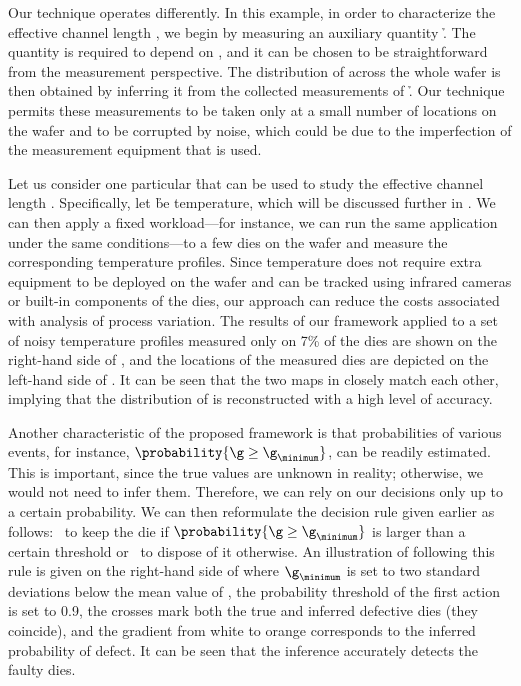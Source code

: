 Our technique operates differently. In this example, in order to characterize
the effective channel length \g, we begin by measuring an auxiliary quantity \h.
The quantity is required to depend on \g, and it can be chosen to be
straightforward from the measurement perspective. The distribution of \g across
the whole wafer is then obtained by inferring it from the collected measurements
of \h. Our technique permits these measurements to be taken only at a small
number of locations on the wafer and to be corrupted by noise, which could be
due to the imperfection of the measurement equipment that is used.

Let us consider one particular \h that can be used to study the effective
channel length \g. Specifically, let \h be temperature, which will be discussed
further in . We can then apply a fixed workload---for
instance, we can run the same application under the same conditions---to a few
dies on the wafer and measure the corresponding temperature profiles. Since
temperature does not require extra equipment to be deployed on the wafer and can
be tracked using infrared cameras \cite{mesa-martinez2007} or built-in
components of the dies, our approach can reduce the costs associated with
analysis of process variation. The results of our framework applied to a set of
noisy temperature profiles measured only on 7\% of the dies are shown on the
right-hand side of , and the locations of
the measured dies are depicted on the left-hand side of
. It can be seen that the two maps in
 closely match each other, implying that the
distribution of \g is reconstructed with a high level of accuracy.

Another characteristic of the proposed framework is that probabilities of
various events, for instance, $\probability{\g \geq \g_\minimum}$, can be
readily estimated. This is important, since the true values are unknown in
reality; otherwise, we would not need to infer them. Therefore, we can rely on
our decisions only up to a certain probability. We can then reformulate the
decision rule given earlier as follows: \one~to keep the die if $\probability{\g
\geq \g_\minimum}$ is larger than a certain threshold or \two~to dispose of it
otherwise. An illustration of following this rule is given on the right-hand
side of  where $\g_\minimum$ is set to two
standard deviations below the mean value of \g, the probability threshold of the
first action is set to 0.9, the crosses mark both the true and inferred
defective dies (they coincide), and the gradient from white to orange
corresponds to the inferred probability of defect. It can be seen that the
inference accurately detects the faulty dies.

